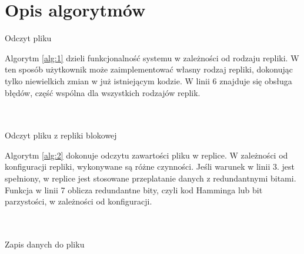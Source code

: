 \newpage
\section{Opis algorytmów}

{\small
\begin{pseudokod}[H]
\caption{Odczyt pliku}\label{alg:1}
\end{pseudokod}
}

Algorytm \ref{alg:1} dzieli funkcjonalność systemu w zależności od rodzaju repliki. W ten sposób użytkownik może zaimplementować własny rodzaj repliki, dokonując tylko niewielkich zmian w już istniejącym kodzie. W linii 6 znajduje się obsługa błędów, część wspólna dla wszystkich rodzajów replik.
\\
\\
\\
{\small
\begin{pseudokod}[H]
\caption{Odczyt pliku z repliki blokowej}\label{alg:2}
\end{pseudokod}
}

Algorytm \ref{alg:2} dokonuje odczytu zawartości pliku w replice. W zależności od konfiguracji repliki, wykonywane są różne czynności. Jeśli warunek w linii 3. jest spełniony, w replice jest stosowane przeplatanie danych z redundantnymi bitami. Funkcja w linii 7 oblicza redundantne bity, czyli kod Hamminga lub bit parzystości, w zależności od konfiguracji.
\\
\\
\\
{\small
\begin{pseudokod}[H]
\caption{Zapis danych do pliku}\label{alg:mine}
\end{pseudokod}
}


